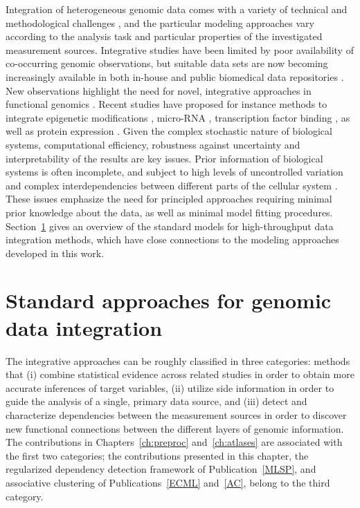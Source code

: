 Integration of heterogeneous genomic data comes with a variety of
technical and methodological challenges \citep{Hwang05,
  Troyanskaya05}, and the particular modeling approaches vary
according to the analysis task and particular properties of the
investigated measurement sources.  Integrative studies have been
limited by poor availability of co-occurring genomic observations, but
suitable data sets are now becoming increasingly available in both
in-house and public biomedical data repositories \citep{tcga08}.  New
observations highlight the need for novel, integrative approaches in
functional genomics \citep{Coe08}. Recent studies have proposed for
instance methods to integrate epigenetic modifications
\citep{Sadikovic2008}, micro-RNA \citep{Qin2008}, transcription factor
binding \citep{Savage2010}, as well as protein expression
\citep{Johnson2008}.  Given the complex stochastic nature of
biological systems, computational efficiency, robustness against
uncertainty and interpretability of the results are key issues. Prior
information of biological systems is often incomplete, and subject to
high levels of uncontrolled variation and complex interdependencies
between different parts of the cellular system \citep{Troyanskaya05}.
These issues emphasize the need for principled approaches requiring
minimal prior knowledge about the data, as well as minimal model
fitting procedures. Section~\ref{sec:traditionaldep} gives an overview
of the standard models for high-throughput data integration methods,
which have close connections to the modeling approaches developed in
this work.

\section{Standard approaches for genomic data integration}\label{sec:traditionaldep}

The integrative approaches can be roughly classified in three
categories: methods that (i) combine statistical evidence across
related studies in order to obtain more accurate inferences of target
variables, (ii) utilize side information in order to guide the
analysis of a single, primary data source, and (iii) detect and
characterize dependencies between the measurement sources in order to
discover new functional connections between the different layers of
genomic information. The contributions in Chapters~\ref{ch:preproc}
and~\ref{ch:atlases} are associated with the first two categories; the
contributions presented in this chapter, the regularized dependency
detection framework of Publication~\ref{MLSP}, and associative
clustering of Publications~\ref{ECML} and~\ref{AC}, belong to the
third category.

